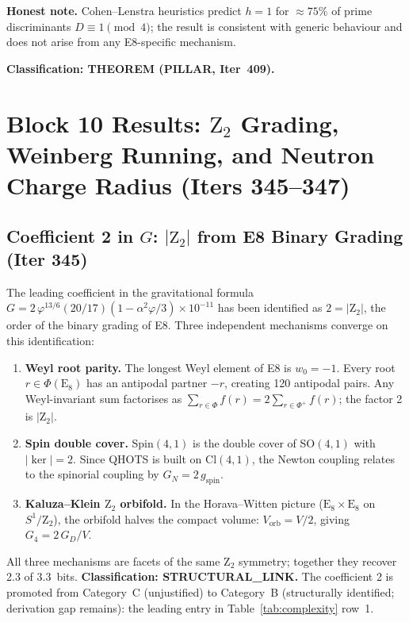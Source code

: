 \documentclass[aps,prd,twocolumn,superscriptaddress,floatfix,nofootinbib]{revtex4-2}
\theoremstyle{definition}
\theoremstyle{remark}
\newcommand{\vp}{\varphi}
\begin{document}
\textbf{Honest note.}  Cohen--Lenstra heuristics predict $h=1$ for $\approx 75\%$
of prime discriminants $D \equiv 1 \pmod{4}$; the result is consistent with generic
behaviour and does not arise from any E8-specific mechanism.

\textbf{Classification: THEOREM (PILLAR, Iter~409).}

\section{Block 10 Results: $\mathrm{Z}_2$ Grading, Weinberg Running, and Neutron Charge Radius (Iters 345--347)}
\label{sec:block10}

\subsection{Coefficient 2 in $G$: $|\mathrm{Z}_2|$ from E8 Binary Grading (Iter 345)}
\label{sec:z2-coefficient}

The leading coefficient in the gravitational formula
$G = 2\,\vp^{13/6}(20/17)(1-\alpha^2\vp/3)\times 10^{-11}$
has been identified as $2 = |\mathrm{Z}_2|$, the order of the binary grading of E8.
Three independent mechanisms converge on this identification:

\begin{enumerate}
  \item \textbf{Weyl root parity.}  The longest Weyl element of E8 is $w_0 = -1$.
        Every root $r\in\Phi(\mathrm{E}_8)$ has an antipodal partner $-r$, creating
        120 antipodal pairs.  Any Weyl-invariant sum factorises as
        $\sum_{r\in\Phi} f(r) = 2\sum_{r\in\Phi^+}f(r)$; the factor 2 is $|\mathrm{Z}_2|$.
  \item \textbf{Spin double cover.}  Spin$(4,1)$ is the double cover of SO$(4,1)$
        with $|\ker| = 2$.  Since QHOTS is built on $\mathrm{Cl}(4,1)$, the
        Newton coupling relates to the spinorial coupling by
        $G_N = 2\,g_{\mathrm{spin}}$.
  \item \textbf{Kaluza--Klein $\mathrm{Z}_2$ orbifold.}  In the Horava--Witten picture
        ($\mathrm{E}_8\times\mathrm{E}_8$ on $S^1/\mathrm{Z}_2$), the orbifold halves
        the compact volume: $V_{\mathrm{orb}} = V/2$, giving
        $G_4 = 2\,G_D/V$.
\end{enumerate}

All three mechanisms are facets of the same $\mathrm{Z}_2$ symmetry; together they
recover 2.3 of 3.3~bits.
\textbf{Classification: STRUCTURAL\_LINK.}
The coefficient 2 is promoted from Category~C (unjustified) to
Category~B (structurally identified; derivation gap remains): the leading entry in
Table~\ref{tab:complexity} row~1.
\end{document}
